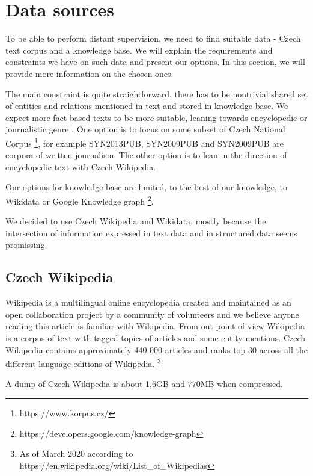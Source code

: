\section{Data sources}

To be able to perform distant supervision, we need to find suitable data - Czech text corpus and a knowledge base. We will explain the requirements and constraints we have on such data and present our options. In this section, we will provide more information on the chosen ones.

The main constraint is quite straightforward, there has to be nontrivial shared set of entities and relations mentioned in text and stored in knowledge base. We expect more fact based texts to be more suitable, leaning towards encyclopedic or journalistic genre . One option is to focus on some subset of Czech National Corpus \footnote{https://www.korpus.cz/}, for example SYN2013PUB, SYN2009PUB and SYN2009PUB are corpora of written journalism. The other option is to lean in the direction of encyclopedic text with Czech Wikipedia.

Our options for knowledge base are limited, to the best of our knowledge, to Wikidata or Google Knowledge graph \footnote{https://developers.google.com/knowledge-graph}. 

We decided to use Czech Wikipedia and Wikidata, mostly because the intersection of information expressed in text data and in structured data seems promissing. 


\subsection{Czech Wikipedia}

Wikipedia is a multilingual online encyclopedia created and maintained as an open collaboration project by a community of volunteers\cite{wiki:wiki} and we believe anyone reading this article is familiar with Wikipedia. From out point of view Wikipedia is a corpus of text with tagged topics of articles and some entity mentions. Czech Wikipedia contains approximately 440 000 articles and ranks top 30 across all the different language editions of Wikipedia.
\footnote{As of March 2020 according to https://en.wikipedia.org/wiki/List\_of\_Wikipedias}

A dump of Czech Wikipedia is about 1,6GB and 770MB when compressed.


